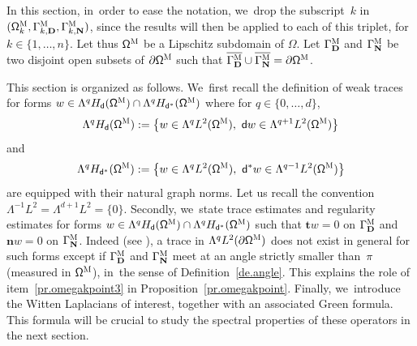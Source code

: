 \documentclass[JEP,XML,SOM,Unicode,NoEqCountersInSection,NoFloatCountersInSection,published]{cedram}
\newcommand{\mbf}[1]{\mathbf{#1}}
\let\pa\partial
\theoremstyle{plain}
\theoremstyle{definition}
\begin{document}
In this section, in~order to ease the notation, we~drop the subscript~$k$ in
$(\mathsf \Omega^{\textsc{M}}_{k}, \Gamma^{\textsc{M}}_{k,\mbf D},
\Gamma^{\textsc{M}}_{k,\mbf N})$, since the results will then be applied to each of
this triplet, for $k \in \{1, \ldots,n\}$.
Let thus $\mathsf \Omega^{\textsc{M}}$ be a Lipschitz subdomain of
$\Omega$. Let $\Gamma^{\textsc{M}}_{\mbf D}$ and
$\Gamma^{\textsc{M}}_{\mbf N}$ be two disjoint open subsets of
$\partial \mathsf \Omega^{\textsc{M}}$ such that
$\overline{\Gamma^{\textsc{M}}_{\mbf D}} \cup
\overline{\Gamma^{\textsc{M}}_{\mbf N}} = \pa \mathsf
\Omega^{\textsc{M}}$.

This section is organized as follows. We~first recall the definition
of weak traces for forms $w\in \Lambda^q H_{\mathsf d} (\mathsf
\Omega^{\textsc{M}})\cap \Lambda^q H_{\mathsf d^*} (\mathsf
\Omega^{\textsc{M}})$
where for $q\in\{0,\ldots,d\}$,
\begin{equation}
\label{eq.H-d}
\Lambda^q H_{\mathsf d} (\mathsf \Omega^{\textsc{M}}):= \left\{w\in \Lambda^q L^2 (\mathsf \Omega^{\textsc{M}}),\ \mathsf dw\in\Lambda^{q+1} L^2 (\mathsf \Omega^{\textsc{M}})\right\}
\end{equation}
and
\begin{equation}
\label{eq.H-d*}
\Lambda^q H_{\mathsf d^*} (\mathsf \Omega^{\textsc{M}}):=\left\{w\in \Lambda^q L^2 (\mathsf \Omega^{\textsc{M}}),\ \mathsf d^*w\in\Lambda^{q-1} L^2 (\mathsf \Omega^{\textsc{M}})\right\}
\end{equation}
are equipped with their natural graph norms. Let us recall the
convention $ \Lambda^{-1} L^2=\Lambda^{d+1} L^2=\{0\}$.
Secondly, we~state trace estimates and regularity estimates for forms $w\in \Lambda^q H_{\mathsf d} (\mathsf \Omega^{\textsc{M}})\cap \Lambda^q H_{\mathsf d^*} (\mathsf \Omega^{\textsc{M}})$ such that $\mbf t w=0$ on $\Gamma^{\textsc{M}}_{\mbf D}$ and $\mbf n w=0$ on $\Gamma^{\textsc{M}}_{\mbf N}$.
Indeed (see \cite{brown-94,jakab-mitrea-mitrea-09}), a trace in $\Lambda^q L^2(\partial \mathsf
\Omega^{\textsc{M}})$ does not exist in general for such forms except if $\Gamma^{\textsc{M}}_{\mbf D}$ and $\Gamma^{\textsc{M}}_{\mbf N}$ meet at an angle strictly
smaller than~$\pi$ (measured in $\mathsf \Omega^{\textsc{M}}$), in~the
sense of
Definition~\ref{de.angle}. This explains the role of item~\eqref{pr.omegakpoint3} in
Proposition~\ref{pr.omegakpoint}. Finally, we~introduce the Witten
Laplacians of interest, together with an associated Green
formula. This formula will be crucial to study the spectral
properties of these operators in the next section.
\end{document}

